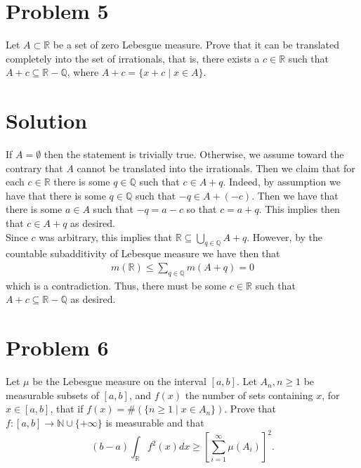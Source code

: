 \documentclass{article}
\begin{document}
\section*{Problem 5}
Let $A\subset\mathbb{R}$ be a set of zero Lebesgue measure.  Prove that it can be translated completely into the set of irrationals, that is, there exists a $c\in\mathbb{R}$ such that $A+c\subseteq\mathbb{R}-\mathbb{Q}$, where $A+c=\{x+c\mid x\in A\}$.

\section*{Solution}
If $A=\emptyset$ then the statement is trivially true.  Otherwise, we assume toward the contrary that $A$ cannot be translated into the irrationals.  Then we claim that for each $c\in\mathbb{R}$ there is some $q\in\mathbb{Q}$ such that $c\in A+q$.  Indeed, by assumption we have that there is some $q\in\mathbb{Q}$ such that $-q\in A+(-c)$.  Then we have that there is some $a\in A$ such that $-q=a-c$ so that $c=a+q$.  This implies then that $c\in A+q$ as desired.\\

\noindent Since $c$ was arbitrary, this implies that $\mathbb{R}\subseteq\bigcup_{q\in\mathbb{Q}}A+q$.  However, by the countable subadditivity of Lebesque measure we have then that
\begin{align*}
m(\mathbb{R})\leq\sum_{q\in\mathbb{Q}}m(A+q)=0
\end{align*}
which is a contradiction.  Thus, there must be some $c\in\mathbb{R}$ such that $A+c\subseteq\mathbb{R}-\mathbb{Q}$ as desired.

\section*{Problem 6}
Let $\mu$ be the Lebesgue measure on the interval $[a,b]$.  Let $A_n,n\geq 1$ be measurable subsets of $[a,b]$, and $f(x)$ the number of sets containing $x$, for $x\in[a,b]$, that if $f(x)=\#(\{n\geq1\mid x\in A_n\})$.  Prove that $f:[a,b]\rightarrow\mathbb{N}\cup\{+\infty\}$ is measurable and that $$(b-a)\int_\mathbb{R}f^2(x)dx\geq\left[\sum_{i=1}^\infty\mu(A_i)\right]^2.$$
\end{document}
